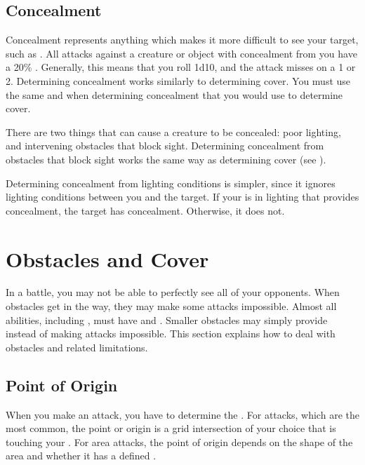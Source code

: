     \subsection{Concealment}\label{Concealment}
        Concealment represents anything which makes it more difficult to see your target, such as .
        All  attacks against a creature or object with concealment from you have a 20\% .
        Generally, this means that you roll 1d10, and the attack misses on a 1 or 2.
        Determining concealment works similarly to determining cover.
        You must use the same  and  when determining concealment that you would use to determine cover.

         There are two things that can cause a creature to be concealed: poor lighting, and intervening obstacles that block sight.
        Determining concealment from obstacles that block sight works the same way as determining cover (see ).

        Determining concealment from lighting conditions is simpler, since it ignores lighting conditions between you and the target.
        If your  is in lighting that provides concealment, the target has concealment.
        Otherwise, it does not.

\section{Obstacles and Cover}\label{Obstacles and Cover}
    In a battle, you may not be able to perfectly see all of your opponents.
    When obstacles get in the way, they may make some attacks impossible.
    Almost all abilities, including , must have  and .
    Smaller obstacles may simply provide  instead of making attacks impossible.
    This section explains how to deal with obstacles and related limitations.

    \subsection{Point of Origin}\label{Point of Origin}
        When you make an attack, you have to determine the .
        For  attacks, which are the most common, the point or origin is a grid intersection of your choice that is touching your .
        For area attacks, the point of origin depends on the shape of the area and whether it has a defined .

